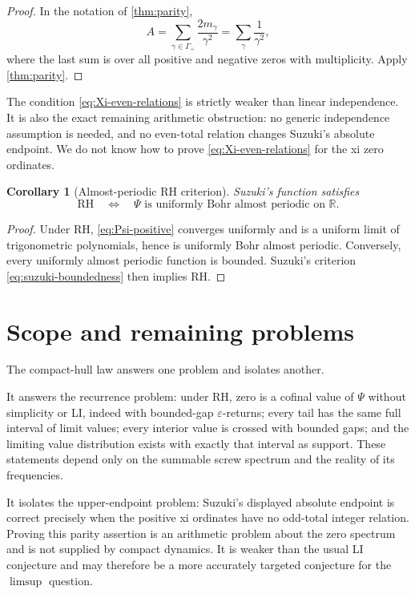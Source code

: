 \documentclass[11pt]{article}
\newtheorem{corollary}[theorem]{Corollary}
\theoremstyle{remark}
\newcommand{\R}{\mathbb R}
\begin{document}
\begin{proof}
In the notation of \cref{thm:parity},
\[
 A=\sum_{\gamma\in\Gamma_+}\frac{2m_\gamma}{\gamma^2}
  =\sum_\gamma\frac1{\gamma^2},
\]
where the last sum is over all positive and negative zeros with multiplicity.  Apply
\cref{thm:parity}.
\end{proof}

The condition \eqref{eq:Xi-even-relations} is strictly weaker than linear independence.  It is also
the exact remaining arithmetic obstruction: no generic independence assumption is needed, and no
even-total relation changes Suzuki's absolute endpoint.  We do not know how to prove
\eqref{eq:Xi-even-relations} for the xi zero ordinates.

\begin{corollary}[Almost-periodic RH criterion]\label{cor:AP-RH}
Suzuki's function satisfies
\begin{equation}\label{eq:AP-RH}
 \mathrm{RH}\quad\Longleftrightarrow\quad
 \Psi\text{ is uniformly Bohr almost periodic on }\R.
\end{equation}
\end{corollary}

\begin{proof}
Under RH, \eqref{eq:Psi-positive} converges uniformly and is a uniform limit of trigonometric
polynomials, hence is uniformly Bohr almost periodic.  Conversely, every uniformly almost periodic
function is bounded.  Suzuki's criterion \eqref{eq:suzuki-boundedness} then implies RH.
\end{proof}

\section{Scope and remaining problems}

The compact-hull law answers one problem and isolates another.

It answers the recurrence problem: under RH, zero is a cofinal value of $\Psi$ without simplicity or
LI, indeed with bounded-gap $\varepsilon$-returns; every tail has the same full interval of limit
values; every interior value is crossed with bounded gaps; and the limiting value distribution
exists with exactly that interval as support.  These statements depend only on the summable screw
spectrum and the reality of its frequencies.

It isolates the upper-endpoint problem: Suzuki's displayed absolute endpoint is correct precisely
when the positive xi ordinates have no odd-total integer relation.  Proving this parity assertion is
an arithmetic problem about the zero spectrum and is not supplied by compact dynamics.  It is
weaker than the usual LI conjecture and may therefore be a more accurately targeted conjecture for
the $\limsup$ question.
\end{document}
